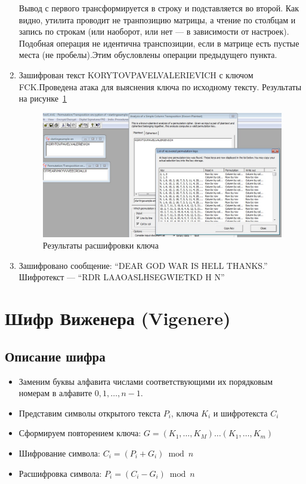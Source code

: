 \documentclass[a4paper, 14pt]{extarticle}
\begin{document}
\begin{enumerate}
    Вывод с первого трансформируется в строку и подставляется во второй. Как видно, утилита проводит не транпозицию матрицы, а чтение по столбцам и запись по строкам (или наоборот, или нет --- в зависимости от настроек).\\ 
    Подобная операция не идентична транспозиции, если в матрице есть пустые места (не пробелы).Этим обусловлены операции предыдущего пункта.\\

    \item Зашифрован текст KORYTOVPAVELVALERIEVICH с ключом FCK.\@ Проведена атака для выяснения ключа по исходному тексту. Результаты на рисунке~\ref{img:2:3}
    \begin{figure}[h]
        \centering
        \includegraphics[width=\textwidth]{./img/S009.jpg}
        \caption{Результаты расшифровки ключа}%
        \label{img:2:3}
    \end{figure}
    
    \item Зашифровано сообщение: ``DEAR GOD WAR IS HELL THANKS.''\\
    Шифротекст --- ``RDR LAAOASLHSEGWIETKD H N''
    
\end{enumerate}

\FloatBarrier{}
\section{Шифр Виженера (Vigenere)}
\subsection{Описание шифра}
\begin{itemize}
    \item Заменим буквы алфавита числами соответствующими их порядковым номерам в алфавите $0, 1, \ldots, n-1$.
    \item Представим символы открытого текста $P_i$, ключа $K_i$ и шифротекста $C_i$
    \item Сформируем  повторением ключа: $G=(K_1, \ldots, K_M) \ldots (K_1, \ldots, K_m)$
    \item Шифрование символа: $C_i = (P_i + G_i) \bmod n$
    \item Расшифровка символа: $P_i = (C_i - G_i) \bmod n$
\end{itemize}
\end{document}
